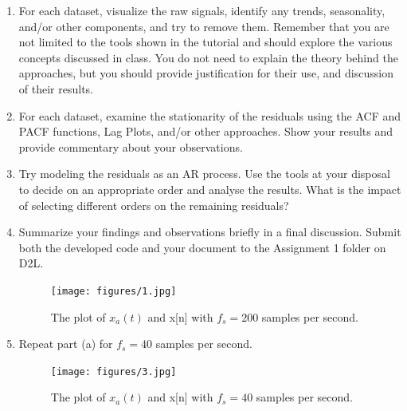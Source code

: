 \documentclass[12pt]{article}
\begin{document}

\pagebreak

\begin{enumerate}



\item For each dataset, visualize the raw signals, identify any trends, seasonality, and/or other components, and try to remove them. Remember that you are not limited to the tools shown in the tutorial and should explore the various concepts discussed in class. You do not need to explain the theory behind the approaches, but you should provide justification for their use, and discussion of their results.
\item For each dataset, examine the stationarity of the residuals using the ACF and PACF functions, Lag Plots, and/or other approaches. Show your results and provide commentary about your observations.
\item Try modeling the residuals as an AR process. Use the tools at your disposal to decide on an appropriate order and analyse the results. What is the impact of selecting different orders on the remaining residuals?
\item Summarize your findings and observations briefly in a final discussion. Submit both the developed code and your document to the Assignment 1 folder on D2L.



\begin{figure}[H]
    \centering
    \begin{minipage}[b]{0.8\textwidth}
        \texttt{[image: figures/1.jpg]}
    \end{minipage}
    \caption{The plot of $x_a(t)$ and x[n] with $f_s = 200$ samples per second.}
    \label{fig:1}
\end{figure}

\item Repeat part (a) for $f_s = 40$ samples per second.
\begin{figure}[H]
    \centering
    \begin{minipage}[b]{0.9\textwidth}
        \texttt{[image: figures/3.jpg]}
    \end{minipage}
    \caption{The plot of $x_a(t)$ and x[n] with $f_s = 40$ samples per second.}
    \label{fig:3}
\end{figure}


\end{enumerate}
\end{document}
